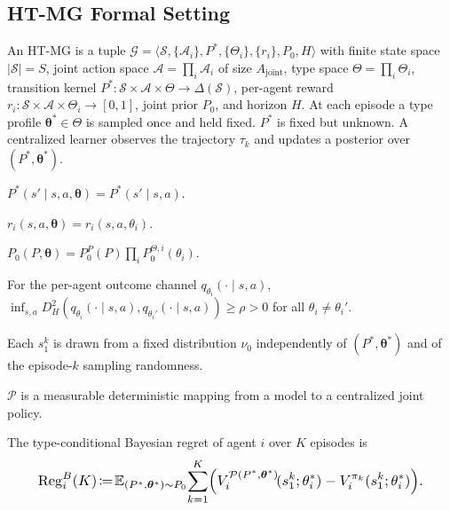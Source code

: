 \subsection{HT-MG Formal Setting}
\label{sec:setting-app}

An HT-MG is a tuple $\mathcal{G} = \langle \mathcal{S}, \{\mathcal{A}_i\}, P^*, \{\Theta_i\}, \{r_i\}, P_0, H \rangle$ with finite state space $|\mathcal S|=S$, joint action space $\mathcal A=\prod_i \mathcal A_i$ of size $A_{\mathrm{joint}}$, type space $\Theta=\prod_i \Theta_i$, transition kernel $P^*\!:\!\mathcal S\!\times\!\mathcal A\!\times\!\Theta\to\Delta(\mathcal S)$, per-agent reward $r_i\!:\!\mathcal S\!\times\!\mathcal A\!\times\!\Theta_i\!\to\![0,1]$, joint prior $P_0$, and horizon $H$. At each episode a type profile $\boldsymbol\theta^* \in \Theta$ is sampled once and held fixed. $P^*$ is fixed but unknown. A centralized learner observes the trajectory $\tau_k$ and updates a posterior over $(P^*, \boldsymbol\theta^*)$.

\begin{assumption}[TI]\label{ass:TI}$P^*(s'\!\mid\! s,a,\boldsymbol\theta)=P^*(s'\!\mid\! s,a)$.\end{assumption}
\begin{assumption}[RL]\label{ass:RL}$r_i(s,a,\boldsymbol\theta)=r_i(s,a,\theta_i)$.\end{assumption}
\begin{assumption}[PF]\label{ass:PF}$P_0(P,\boldsymbol\theta)=P_0^P(P)\prod_i P_0^{\Theta,i}(\theta_i)$.\end{assumption}
\begin{assumption}[TID]\label{ass:TID}For the per-agent outcome channel $q_{\theta_i}(\cdot\mid s,a)$, $\inf_{s,a}D_H^2(q_{\theta_i}(\cdot\mid s,a),q_{\theta_i'}(\cdot\mid s,a))\geq\rho>0$ for all $\theta_i\neq\theta_i'$.\end{assumption}
\begin{assumption}[ISI]\label{ass:ISI}Each $s_1^k$ is drawn from a fixed distribution $\nu_0$ independently of $(P^*,\boldsymbol\theta^*)$ and of the episode-$k$ sampling randomness.\end{assumption}
\begin{assumption}[DP]\label{ass:DP}$\mathcal P$ is a measurable deterministic mapping from a model to a centralized joint policy.\end{assumption}

The type-conditional Bayesian regret of agent $i$ over $K$ episodes is
\begin{equation}\label{eq:regret-def}\resizebox{0.9\linewidth}{!}{$\displaystyle \mathrm{Reg}_i^B(K) \!\coloneqq\! \mathbb{E}_{(P^*,\boldsymbol\theta^*)\sim P_0}\!\sum_{k=1}^K\!\Big(V_i^{\mathcal P(P^*,\boldsymbol\theta^*)}\!(s_1^k;\theta_i^*) - V_i^{\pi_k}(s_1^k;\theta_i^*)\Big). $}\end{equation}

